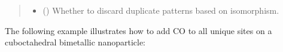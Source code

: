 \documentclass[letterpaper,10pt,english]{sphinxmanual}
\begin{document}
\begin{fulllineitems}
\begin{fulllineitems}
\begin{quote}
\begin{description}
\begin{itemize}
\item {} 
 (\sphinxstyleliteralemphasis{\sphinxupquote{, }}) \textendash{} Whether to discard duplicate patterns based on isomorphism.

\end{itemize}

\end{description}\end{quote}

\end{fulllineitems}


\end{fulllineitems}



The following example illustrates how to add CO to all unique sites on
a cuboctahedral bimetallic nanoparticle:
\end{document}
